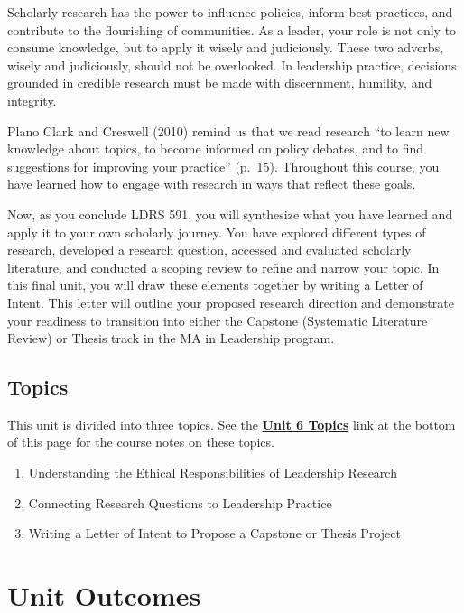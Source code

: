 \documentclass[
  letterpaper,
  DIV=11,
  numbers=noendperiod]{scrreprt}
\providecommand{\tightlist}{%
  \setlength{\itemsep}{0pt}\setlength{\parskip}{0pt}}\usepackage{longtable,booktabs,array}
\begin{document}
Scholarly research has the power to influence policies, inform best
practices, and contribute to the flourishing of communities. As a
leader, your role is not only to consume knowledge, but to apply it
wisely and judiciously. These two adverbs, wisely and judiciously,
should not be overlooked. In leadership practice, decisions grounded in
credible research must be made with discernment, humility, and
integrity.

Plano Clark and Creswell (2010) remind us that we read research ``to
learn new knowledge about topics, to become informed on policy debates,
and to find suggestions for improving your practice'' (p.~15).
Throughout this course, you have learned how to engage with research in
ways that reflect these goals.

Now, as you conclude LDRS 591, you will synthesize what you have learned
and apply it to your own scholarly journey. You have explored different
types of research, developed a research question, accessed and evaluated
scholarly literature, and conducted a scoping review to refine and
narrow your topic. In this final unit, you will draw these elements
together by writing a Letter of Intent. This letter will outline your
proposed research direction and demonstrate your readiness to transition
into either the Capstone (Systematic Literature Review) or Thesis track
in the MA in Leadership program.

\subsection*{Topics}\label{topics-5}

This unit is divided into three topics. See the
\href{https://learn.twu.ca/mod/book/view.php?id=1171452}{\textbf{Unit 6
Topics}} link at the bottom of this page for the course notes on these
topics.

\begin{enumerate}
\def\labelenumi{\arabic{enumi}.}
\tightlist
\item
  Understanding the Ethical Responsibilities of Leadership Research
\item
  Connecting Research Questions to Leadership Practice
\item
  Writing a Letter of Intent to Propose a Capstone or Thesis Project
\end{enumerate}

\section*{Unit Outcomes}\label{unit-outcomes-4}
\end{document}

